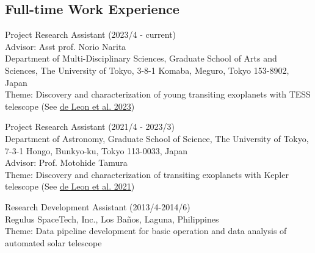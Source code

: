 \documentclass[12pt,letterpaper]{article}
\begin{document}
\subsection{Full-time Work Experience}
\begin{list}{}{\cvlist}
  \item
      Project Research Assistant (2023/4 - current) \\
      Advisor: Asst prof. Norio Narita \\
      Department of Multi-Disciplinary Sciences, Graduate School of Arts and Sciences, The University of Tokyo, 3-8-1 Komaba, Meguro, Tokyo 153-8902, Japan \\
      Theme: Discovery and characterization of young transiting exoplanets with TESS telescope (See \href{\paperthree}{de Leon et al. 2023})\\
  \item
      Project Research Assistant (2021/4 - 2023/3) \\
      Department of Astronomy, Graduate School of Science, The University of Tokyo, 7-3-1 Hongo, Bunkyo-ku, Tokyo 113-0033, Japan \\
      Advisor: Prof. Motohide Tamura \\
      Theme: Discovery and characterization of transiting exoplanets with Kepler telescope (See \href{\papertwo}{de Leon et al. 2021}) \\
  \item Research Development Assistant (2013/4-2014/6)\\
      Regulus SpaceTech, Inc., Los Ba\~nos, Laguna, Philippines\\
      Theme: Data pipeline development for basic operation and data analysis of automated solar telescope
\end{list}
\end{document}
